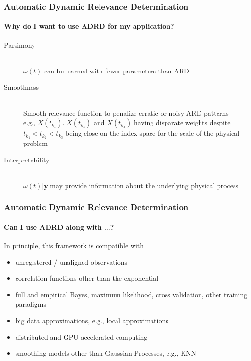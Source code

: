 \documentclass{snedecorbeamer}
\begin{document}
\begin{frame}
  \frametitle{Automatic Dynamic Relevance Determination}
  \framesubtitle{Why do I want to use \textsc{ADRD} for my application?}

  \begingroup
  \begin{description}
  \item[Parsimony] \mbox{}\\
    $\omega(t)$ can be learned with fewer parameters than \textsc{ARD}
  \item[Smoothness] \mbox{}\\
    Smooth relevance function to penalize erratic or noisy \textsc{ARD} patterns
    \\
    e.g., $X(t_{k_1})$, $X(t_{k_2})$ and
    $X(t_{k_3})$ having disparate weights despite $t_{k_1} < t_{k_2} <
    t_{k_3}$ being close on the index space for the scale of the physical
    problem
  \item[Interpretability] \mbox{}\\
    $\omega(t) | \mathbf{y}$ may provide information about the underlying
    physical process
  \end{description}
  \endgroup
\end{frame}

\begin{frame}
  \frametitle{Automatic Dynamic Relevance Determination}
  \framesubtitle{Can I use \textsc{ADRD} along with $\dots$?}

  In principle, this framework is compatible with
  \begin{itemize}
  \item unregistered / unaligned observations
  \item correlation functions other than the exponential
  \item full and empirical Bayes, maximum likelihood, cross validation,
    other training paradigms
  \item big data approximations, e.g., local approximations
  \item distributed and GPU-accelerated computing
  \item smoothing models other than Gaussian Processes, e.g., KNN
  \end{itemize}
\end{frame}
\end{document}
